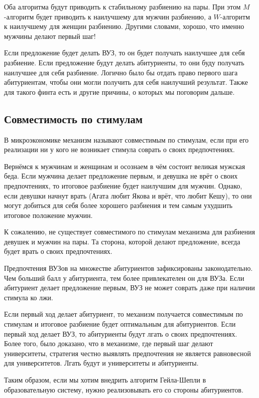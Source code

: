 \documentclass[pdftex, 12pt, a4paper]{article}
\begin{document}
Оба алгоритма будут приводить к стабильному разбиению на пары. При этом $M$-алгоритм будет приводить к наилучшему для мужчин разбиению, а $W$-алгоритм к наилучшему для женщин разбиению. Другими словами, хорошо, что именно мужчины делают первый шаг!  

Если предложение будет делать ВУЗ, то он будет получать наилучшее для себя разбиение. Если предложение будут делать абитуриенты, то они буду получать наилучшее для себя разбиение. Логично было бы отдать право первого шага абитуриентам, чтобы они могли получить для себя наилучший результат. Также для такого финта есть и другие причины, о которых мы поговорим дальше. 

\subsection*{Совместимость по стимулам} 

В микроэкономике механизм называют совместимым по стимулам, если при его реализации ни у кого не возникает стимула соврать о своих предпочтениях. 

Вернёмся к мужчинам и женщинам и осознаем в чём состоит великая мужская беда. Если мужчина делает предложение первым, и девушка не врёт о своих предпочтениях, то итоговое разбиение будет наилучшим для мужчин. Однако, если девушки начнут врать (Агата любит Якова и врёт, что любит Кешу), то они могут добиться для себя более хорошего разбиения и тем самым ухудшить итоговое положение мужчин.

К сожалению, не существует совместимого по стимулам механизма для разбиения девушек и мужчин на пары. Та сторона, которой делают предложение, всегда будет врать о своих предпочтениях. 

Предпочтения ВУЗов на множестве абитуриентов зафиксированы законодательно. Чем больший балл у абитуриента, тем более привлекателен он для ВУЗа. Если абитуриент делает предложение первым, ВУЗ не может соврать даже при наличии стимула ко лжи. 

Если первый ход делает абитуриент, то механизм получается совместимым по стимулам и итоговое разбиение будет оптимальным для абитуриентов. Если первый ход делает ВУЗ, то абитуриенты будут лгать о своих предпочтениях. Более того, было доказано, что в механизме, где первый шаг делают университеты, стратегия честно выявлять предпочтения не является равновесной для университетов. Лгать будут и университеты и абитуриенты.

Таким образом, если мы хотим внедрить алгоритм Гейла-Шепли в образовательную систему, нужно реализовывать его со стороны абитуриентов. 
\end{document}
